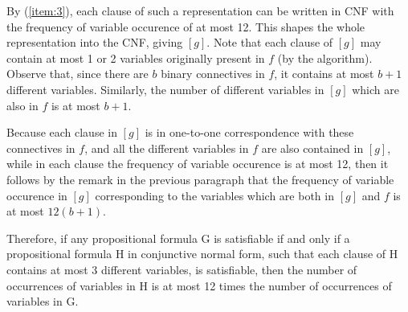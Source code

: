 \documentclass[11pt]{scrartcl}
\begin{document}
\begin{enumerate}
  By (\ref{item:3}), each clause of such a representation can be
  written in CNF with the frequency of variable occurence of at most
  12. This shapes the whole representation into the CNF, giving
  $[g]$. Note that each clause of $[g]$ may contain at most 1 or 2
  variables originally present in $f$ (by the algorithm).  Observe
  that, since there are $b$ binary connectives in $f$, it contains at
  most $b+1$ different variables. Similarly, the number of different
  variables in $[g]$ which are also in $f$ is at most $b+1$.

  Because each clause in $[g]$ is in one-to-one correspondence with
  these connectives in $f$, and all the different variables in $f$ are
  also contained in $[g]$, while in each clause the frequency of
  variable occurence is at most 12, then it follows by the remark in
  the previous paragraph that the frequency of variable occurence in
  $[g]$ corresponding to the variables which are both in $[g]$ and $f$
  is at most $12(b+1)$.

  Therefore, if any propositional formula G is satisfiable if and only
  if a propositional formula H in conjunctive normal form, such that
  each clause of H contains at most 3 different variables, is
  satisfiable, then the number of occurrences of variables in H is at
  most 12 times the number of occurrences of variables in G.

\end{enumerate}
\end{document}
